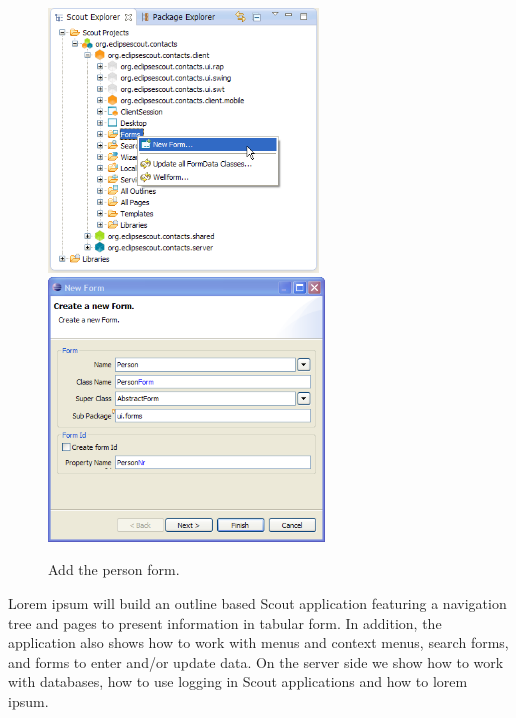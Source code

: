 \documentclass[a4paper,10pt,twoside]{book}
\begin{document}
\begin{figure}
\includegraphics[height=7cm]{new_form_person_contextmenu.png} \hspace{5mm}
\includegraphics[height=7cm]{new_form_person.png}
\caption{Add the person form.}
\end{figure}

Lorem ipsum will build an outline based Scout application featuring a navigation tree and pages to present information in tabular form. 
In addition, the application also shows how to work with menus and context menus, search forms, and forms to enter and/or update data. 
On the server side we show how to work with databases, how to use logging in Scout applications and how to lorem ipsum. 
\end{document}
